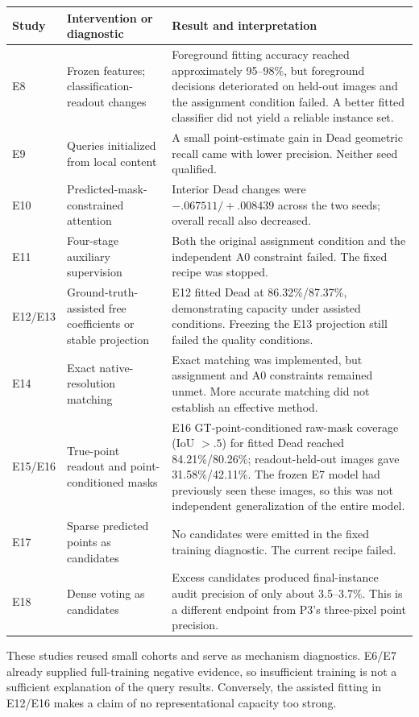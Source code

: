 \documentclass[11pt,a4paper]{article}
\begin{document}
\small
\begin{longtable}{p{18mm}p{43mm}p{89mm}}
\toprule Study & Intervention or diagnostic & Result and interpretation\\\midrule\endhead
E8 & Frozen features; classification-readout changes & Foreground fitting accuracy reached approximately 95--98\%, but foreground decisions deteriorated on held-out images and the assignment condition failed. A better fitted classifier did not yield a reliable instance set.\\
E9 & Queries initialized from local content & A small point-estimate gain in Dead geometric recall came with lower precision. Neither seed qualified.\\
E10 & Predicted-mask-constrained attention & Interior Dead changes were $-.067511/+.008439$ across the two seeds; overall recall also decreased.\\
E11 & Four-stage auxiliary supervision & Both the original assignment condition and the independent A0 constraint failed. The fixed recipe was stopped.\\
E12/E13 & Ground-truth-assisted free coefficients or stable projection & E12 fitted Dead at 86.32\%/87.37\%, demonstrating capacity under assisted conditions. Freezing the E13 projection still failed the quality conditions.\\
E14 & Exact native-resolution matching & Exact matching was implemented, but assignment and A0 constraints remained unmet. More accurate matching did not establish an effective method.\\
E15/E16 & True-point readout and point-conditioned masks & E16 GT-point-conditioned raw-mask coverage (IoU $>.5$) for fitted Dead reached 84.21\%/80.26\%; readout-held-out images gave 31.58\%/42.11\%. The frozen E7 model had previously seen these images, so this was not independent generalization of the entire model.\\
E17 & Sparse predicted points as candidates & No candidates were emitted in the fixed training diagnostic. The current recipe failed.\\
E18 & Dense voting as candidates & Excess candidates produced final-instance audit precision of only about 3.5--3.7\%. This is a different endpoint from P3's three-pixel point precision.\\\bottomrule
\end{longtable}
\normalsize

These studies reused small cohorts and serve as mechanism diagnostics. E6/E7 already supplied full-training negative evidence, so insufficient training is not a sufficient explanation of the query results. Conversely, the assisted fitting in E12/E16 makes a claim of no representational capacity too strong.
\end{document}
